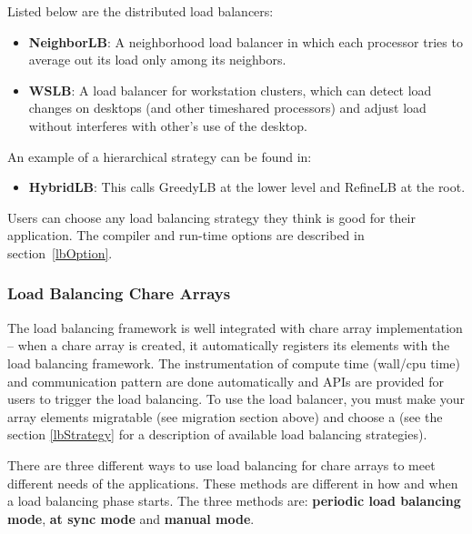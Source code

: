 Listed below are the distributed load balancers:
\begin{itemize}
\item {\bf NeighborLB}:   A neighborhood load balancer in which each processor tries to average out its load only among its neighbors.
\item {\bf WSLB}:   A load balancer for workstation clusters, which can detect load changes on desktops (and other timeshared processors) and adjust load without interferes with other's use of the desktop.
\end{itemize}

An example of a hierarchical strategy can be found in:
\begin{itemize}
\item {\bf HybridLB}: This calls GreedyLB at the lower level and RefineLB at
the root.
\end{itemize}

Users can choose any load balancing strategy they think is good for their
application. The compiler and run-time options are described in
section~\ref{lbOption}.


\subsubsection{Load Balancing Chare Arrays}
\label{lbarray}

The load balancing framework is well integrated with chare array implementation
-- when a chare array is created, it automatically registers its elements with
the load balancing framework. The instrumentation of compute time (wall/cpu
time) and communication pattern are done automatically and APIs are provided
for users to trigger the load balancing.  To use the load balancer, you must
make your array elements migratable (see migration section above) and choose a
 (see the section \ref{lbStrategy} for a
description of available load balancing strategies).

There are three different ways to use load balancing for chare arrays to meet
different needs of the applications. These methods are different in how and
when a load balancing phase starts. The three methods are: {\bf periodic load
balancing mode}, {\bf at sync mode} and {\bf manual mode}.

